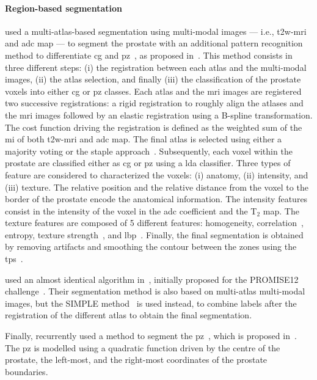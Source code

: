 \paragraph{Region-based segmentation}
\citeauthor{Litjens2012} used a multi-atlas-based segmentation using multi-modal images --- i.e., \ac{t2w}-\ac{mri} and \ac{adc} map --- to segment the prostate with an additional pattern recognition method to differentiate \ac{cg} and \ac{pz}~\cite{Litjens2012}, as proposed in~\cite{Litjens2012a}.
This method consists in three different steps: (i) the registration between each atlas and the multi-modal images, (ii) the atlas selection, and finally (iii) the classification of the prostate voxels into either \ac{cg} or \ac{pz} classes.
Each atlas and the \ac{mri} images are registered two successive registrations: a rigid registration to roughly align the atlases and the \ac{mri} images followed by an elastic registration using a B-spline transformation.
The cost function driving the registration is defined as the weighted sum of the \ac{mi} of both \ac{t2w}-\ac{mri} and \ac{adc} map.
The final atlas is selected using either a majority voting or the \ac{staple} approach~\cite{Warfield2004}.
Subsequently, each voxel within the prostate are classified either as \ac{cg} or \ac{pz} using a \ac{lda} classifier.
Three types of feature are considered to characterized the voxels: (i) anatomy, (ii) intensity, and (iii) texture.
The relative position and the relative distance from the voxel to the border of the prostate encode the anatomical information.
The intensity features consist in the intensity of the voxel in the \ac{adc} coefficient and the T$_2$ map.
The texture features are composed of 5 different features: homogeneity, correlation~\cite{Amadasun1989}, entropy, texture strength~\cite{Li2005a}, and \ac{lbp}~\cite{Ojala1996}.
Finally, the final segmentation is obtained by removing artifacts and smoothing the contour between the zones using the \ac{tps}~\cite{Bookstein1989}.

\citeauthor{Litjens2014} used an almost identical algorithm in~\cite{Litjens2014}, initially proposed for the PROMISE12 challenge~\cite{Litjens2014a}.
Their segmentation method is also based on multi-atlas multi-modal images, but the SIMPLE method~\cite{langerak2010label} is used instead, to combine labels after the registration of the different atlas to obtain the final segmentation.
 
Finally, \citeauthor{rampun2016computerb} recurrently used a method to segment the \ac{pz}~\cite{rampun2015classifying,rampun2015computer,rampun2016computer,rampun2016computerb,rampun2016quantitative}, which is proposed in~\cite{rampun2014detection}.
The \ac{pz} is modelled using a quadratic function driven by the centre of the prostate, the left-most, and the right-most coordinates of the prostate boundaries.

